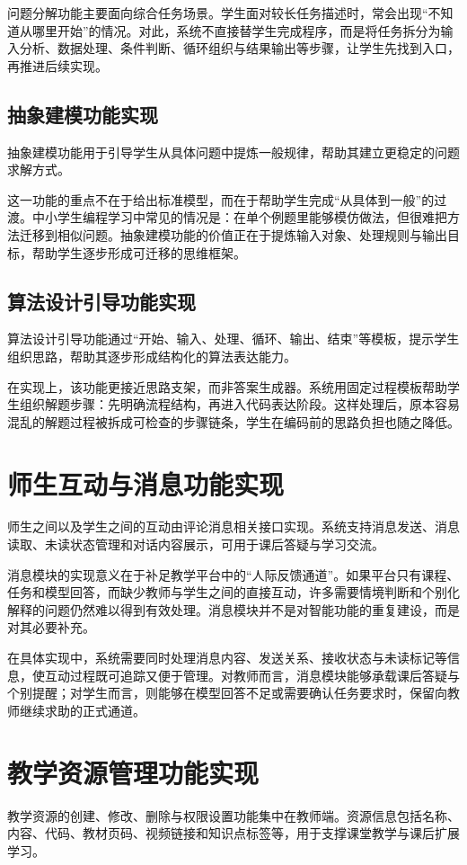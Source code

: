 问题分解功能主要面向综合任务场景。学生面对较长任务描述时，常会出现“不知道从哪里开始”的情况。对此，系统不直接替学生完成程序，而是将任务拆分为输入分析、数据处理、条件判断、循环组织与结果输出等步骤，让学生先找到入口，再推进后续实现。

\subsection{抽象建模功能实现}
抽象建模功能用于引导学生从具体问题中提炼一般规律，帮助其建立更稳定的问题求解方式。

这一功能的重点不在于给出标准模型，而在于帮助学生完成“从具体到一般”的过渡。中小学生编程学习中常见的情况是：在单个例题里能够模仿做法，但很难把方法迁移到相似问题。抽象建模功能的价值正在于提炼输入对象、处理规则与输出目标，帮助学生逐步形成可迁移的思维框架。

\subsection{算法设计引导功能实现}
算法设计引导功能通过“开始、输入、处理、循环、输出、结束”等模板，提示学生组织思路，帮助其逐步形成结构化的算法表达能力。

在实现上，该功能更接近思路支架，而非答案生成器。系统用固定过程模板帮助学生组织解题步骤：先明确流程结构，再进入代码表达阶段。这样处理后，原本容易混乱的解题过程被拆成可检查的步骤链条，学生在编码前的思路负担也随之降低。

\section{师生互动与消息功能实现}
师生之间以及学生之间的互动由评论消息相关接口实现。系统支持消息发送、消息读取、未读状态管理和对话内容展示，可用于课后答疑与学习交流。

消息模块的实现意义在于补足教学平台中的“人际反馈通道”\cite{yao2022dialogue,li2023trust}。如果平台只有课程、任务和模型回答，而缺少教师与学生之间的直接互动，许多需要情境判断和个别化解释的问题仍然难以得到有效处理。消息模块并不是对智能功能的重复建设，而是对其必要补充。

在具体实现中，系统需要同时处理消息内容、发送关系、接收状态与未读标记等信息，使互动过程既可追踪又便于管理\cite{li2023trust}。对教师而言，消息模块能够承载课后答疑与个别提醒；对学生而言，则能够在模型回答不足或需要确认任务要求时，保留向教师继续求助的正式通道。

\section{教学资源管理功能实现}
教学资源的创建、修改、删除与权限设置功能集中在教师端。资源信息包括名称、内容、代码、教材页码、视频链接和知识点标签等，用于支撑课堂教学与课后扩展学习。

